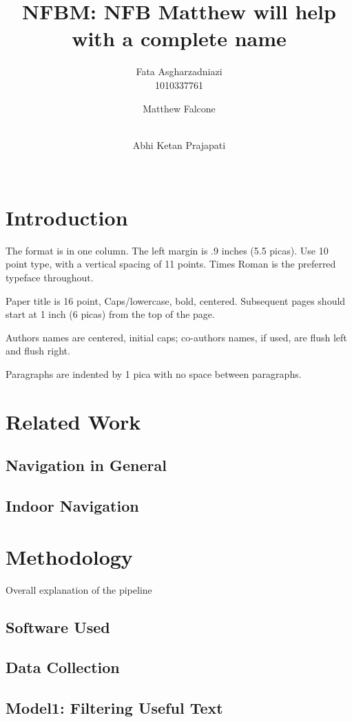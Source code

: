 \documentclass[a4paper]{article}
\title{NFBM: NFB Matthew will help with a complete name }
\author{
Fata Asgharzadniazi \\ 1010337761\\
\and
Matthew Falcone \\ \\
\and
Abhi Ketan Prajapati \\ \\
}
\begin{document}
\maketitle

\begin{abstract}
\end{abstract}


\section{Introduction}

The format is in one column. The left margin is .9 inches (5.5 picas). Use 10 point type,
with a vertical spacing of 11 points. Times Roman is the preferred
typeface throughout.

Paper title is 16 point, Caps/lowercase, bold, centered. Subsequent
pages should start at 1 inch (6 picas) from the top of the page.

Authors names are centered, initial caps; co-authors names, if used, are
flush left and flush right.

Paragraphs are indented by 1 pica with no space between paragraphs.

\section{Related Work}
\subsection{Navigation in General}

\subsection{Indoor Navigation}

\section{Methodology}
Overall explanation of the pipeline
\subsection{Software Used}

\subsection{Data Collection}

\subsection{Model1: Filtering Useful Text}
\end{document}
